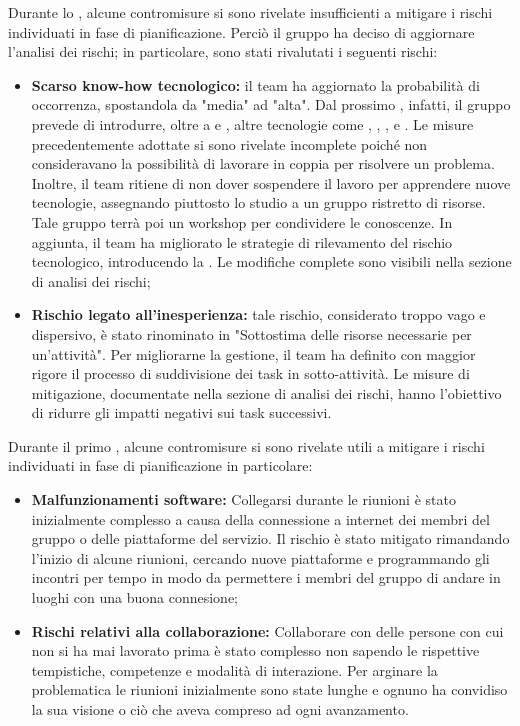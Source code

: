 \vspace{0.5\baselineskip}
\par Durante lo , alcune contromisure si sono rivelate insufficienti a mitigare i rischi individuati in fase di pianificazione. Perciò il gruppo ha deciso di aggiornare l'analisi dei rischi; in particolare, sono stati rivalutati i seguenti rischi:
\begin{itemize}
  \item \textbf{Scarso know-how tecnologico:} il team ha aggiornato la probabilità di occorrenza, spostandola da "media" ad "alta". Dal prossimo , infatti, il gruppo prevede di introdurre, oltre a  e , altre tecnologie come , , ,  e . Le misure precedentemente adottate si sono rivelate incomplete poiché non consideravano la possibilità di lavorare in coppia per risolvere un problema. Inoltre, il team ritiene di non dover sospendere il lavoro per apprendere nuove tecnologie, assegnando piuttosto lo studio a un gruppo ristretto di risorse. Tale gruppo terrà poi un workshop per condividere le conoscenze. In aggiunta, il team ha migliorato le strategie di rilevamento del rischio tecnologico, introducendo la . Le modifiche complete sono visibili nella sezione di analisi dei rischi;
  \item \textbf{Rischio legato all'inesperienza:} tale rischio, considerato troppo vago e dispersivo, è stato rinominato in "Sottostima delle risorse necessarie per un'attività". Per migliorarne la gestione, il team ha definito con maggior rigore il processo di suddivisione dei task in sotto-attività. Le misure di mitigazione, documentate nella sezione di analisi dei rischi, hanno l'obiettivo di ridurre gli impatti negativi sui task successivi.
\end{itemize}


\vspace{0.5\baselineskip}
\par Durante il primo , alcune contromisure si sono rivelate utili a mitigare i rischi individuati in fase di pianificazione in particolare:
\begin{itemize}
  \item \textbf{Malfunzionamenti software:} Collegarsi durante le riunioni è stato inizialmente complesso a causa della connessione a internet dei membri del gruppo o delle piattaforme del servizio. Il rischio è stato mitigato rimandando l'inizio di alcune riunioni, cercando nuove piattaforme e programmando gli incontri per tempo in modo da permettere i membri del gruppo di andare in luoghi con una buona connesione;
  \item \textbf{Rischi relativi alla collaborazione:} Collaborare con delle persone con cui non si ha mai lavorato prima è stato complesso non sapendo le rispettive tempistiche, competenze e modalità di interazione. Per arginare la problematica le riunioni inizialmente sono state lunghe e ognuno ha convidiso la sua visione o ciò che aveva compreso ad ogni avanzamento.
\end{itemize}
